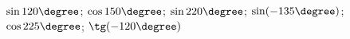 \begin{ex}[type=calculate]
	\begin{condition}
		\( \sin120\degree \); \( \cos150\degree \); \( \sin220\degree \); \( \sin(-135\degree) \); \( \cos225\degree \); \( \tg(-120\degree) \)
	\end{condition}
\end{ex}